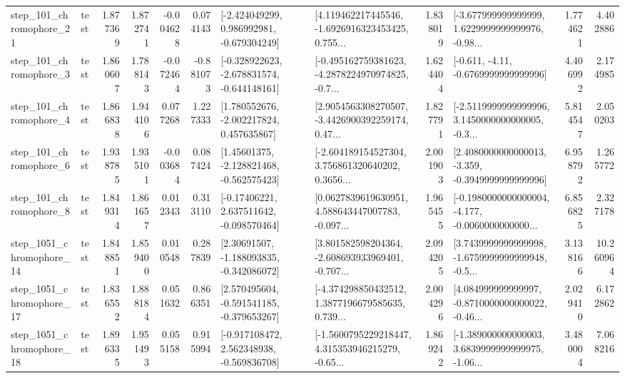 \begin{tabular}{llrrrrllrlrr}
  step\_101\_chromophore\_21 &      test &      1.877369 &    1.872741 &     -0.004628 &  0.074143 &   [-2.424049299, 0.986992981, -0.679304249] &  [4.119462217445546, -1.6926916323453425, 0.755... &       1.838019 &  [-3.677999999999999, 1.6229999999999976, -0.98... &            1.774621 &          4.402886 \\
   step\_101\_chromophore\_3 &      test &      1.860607 &    1.788143 &     -0.072464 & -0.881073 &  [-0.328922623, -2.678831574, -0.644148161] &  [-0.495162759381623, -4.2878224970974825, -0.7... &       1.624404 &               [-0.611, -4.11, -0.6769999999999996] &            4.406992 &          2.174985 \\
   step\_101\_chromophore\_4 &      test &      1.866838 &    1.944106 &      0.077268 &  1.227333 &    [1.780552676, -2.002217824, 0.457635867] &  [2.9054563308270507, -3.4426900392259174, 0.47... &       1.827791 &  [-2.5119999999999996, 3.1450000000000005, -0.3... &            5.814547 &          2.050203 \\
   step\_101\_chromophore\_6 &      test &      1.938785 &    1.935101 &     -0.003684 &  0.087424 &    [1.45601375, -2.128821468, -0.562575423] &  [-2.604189154527304, 3.756861320640202, 0.3656... &       2.001903 &  [2.4080000000000013, -3.359, -0.3949999999999996] &            6.958792 &          1.265772 \\
   step\_101\_chromophore\_8 &      test &      1.849314 &    1.861657 &      0.012343 &  0.313110 &    [-0.17406221, 2.637511642, -0.098570464] &  [0.0627839619630951, 4.588643447007783, -0.097... &       1.965455 &  [-0.1980000000000004, -4.177, -0.0060000000000... &            6.856825 &          2.327178 \\
 step\_1051\_chromophore\_14 &      test &      1.848851 &    1.859400 &      0.010548 &  0.287839 &    [2.30691507, -1.188093835, -0.342086072] &  [3.801582598204364, -2.608693933969401, -0.707... &       2.094205 &  [3.7439999999999998, -1.6759999999999948, -0.5... &            3.138166 &         10.260964 \\
 step\_1051\_chromophore\_17 &      test &      1.836552 &    1.888184 &      0.051632 &  0.866351 &   [2.570495604, -0.591541185, -0.379653267] &  [-4.374298850432512, 1.3877196679585635, 0.739... &       2.004296 &  [4.084999999999997, -0.8710000000000022, -0.46... &            2.029410 &          6.172862 \\
 step\_1051\_chromophore\_18 &      test &      1.896335 &    1.951493 &      0.055158 &  0.915994 &   [-0.917108472, 2.562348938, -0.569836708] &  [-1.5600795229218447, 4.315353946215279, -0.65... &       1.869242 &  [-1.389000000000003, 3.6839999999999975, -1.06... &            3.480004 &          7.068216 \\

\end{tabular}
